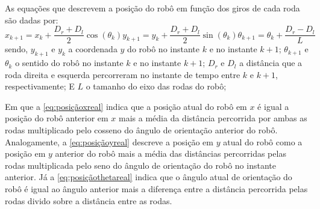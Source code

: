 As equações que descrevem a posição do robô em função dos giros de cada roda são dadas por:
\begin{subequations}
	\begin{equation}
	x_{k+1} = x_{k} + \dfrac{D_{r} + D_{l}}{2}\cos(\theta_{k}) 
	\label{eq:posiçãoxreal}
	\end{equation}
	\begin{equation}
	y_{k+1} = y_{k} + \dfrac{D_{r} + D_{l}}{2}\sin(\theta_{k}) 
	\label{eq:posiçãoyreal}
	\end{equation}
	\begin{equation}
	\theta_{k+1} = \theta_{k} + \dfrac{D_{r} - D_{l}}{L}
	\label{eq:posiçãothetareal}
	\end{equation}
	\label{eq:posicaorealEnc}
\end{subequations}
sendo, $y_{k+1}$ e $y_{k}$ a coordenada $y$ do robô no instante $k$ e no instante $k+1$; $\theta_{k+1}$ e $\theta_{k}$ o sentido do robô no instante $k$ e no instante $k+1$; $D_{r}$ e $D_{l}$ a distância que a roda direita e esquerda percorreram no instante de tempo entre $k$ e $k+1$, respectivamente; E $L$ o tamanho do eixo das rodas do robô;

Em que a \autoref{eq:posiçãoxreal} indica que a posição atual do robô em $x$ é igual a posição do robô anterior em $x$ mais a média da distância percorrida por ambas as rodas multiplicado pelo cosseno do ângulo de orientação anterior do robô. Analogamente, a \autoref{eq:posiçãoyreal} descreve a posição em $y$ atual do robô como a posição em $y$ anterior do robô mais a média das distâncias percorridas pelas rodas multiplicada pelo seno do ângulo de orientação do robô no instante anterior. Já a \autoref{eq:posiçãothetareal} indica que o ângulo atual de orientação do robô é igual ao ângulo anterior mais a diferença entre a distância percorrida pelas rodas divido sobre a distância entre as rodas. 

